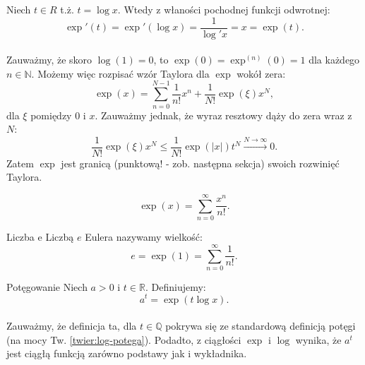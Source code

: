 \documentclass{article}
\newcounter{defi}
\numberwithin{defi}{section}
\numberwithin{defi}{section}
\newcommand{\R}{\mathbb{R}}
\newcommand{\N}{\mathbb{N}}
\newcommand{\Q}{\mathbb{Q}}
\newcommand{\oo}{\infty}
\renewcommand{\leq}{\leqslant}
\begin{document}
\begin{dow}{}
    Niech $t \in R$ t.ż. $t = \log x$. Wtedy z właności pochodnej funkcji odwrotnej: \begin{equation}
        \exp'(t) = \exp'(\log x) = \frac{1}{\log' x} = x = \exp(t).
    \end{equation}
\end{dow}


\paragraph{} Zauważmy, że skoro $\log(1) = 0$, to $\exp(0) = \exp^{(n)}(0) = 1$ dla każdego $n\in \N$. Możemy więc rozpisać wzór Taylora dla $\exp$ wokół zera: \begin{equation}
    \exp(x) = \sum_{n = 0}^{N - 1} \frac{1}{n!} x^n + \frac{1}{N!} \exp(\xi) x^N,
\end{equation} dla $\xi$ pomiędzy 0 i $x$. Zauważmy jednak, że wyraz resztowy dąży do zera wraz z $N$: \begin{equation}
    \frac{1}{N!} \exp(\xi) x^N \leq \frac{1}{N!} \exp(|x|) t^N \xrightarrow{N \to \oo} 0.
\end{equation} Zatem $\exp$ jest granicą (punktową! - zob. następna sekcja) swoich rozwinięć Taylora.

\begin{obs}{}
    \begin{equation}
        \exp(x) = \sum_{n = 0}^{\oo} \frac{x ^ n}{n!}.
    \end{equation}
\end{obs}

\begin{defr}{Liczba e}
    Liczbą $e$ Eulera nazywamy wielkość: \begin{equation}
        e = \exp (1) = \sum_{n = 0}^{\oo} \frac{1}{n!}.
    \end{equation}
\end{defr}

\begin{defr}{Potęgowanie}
    Niech $a > 0$ i $t \in \R$. Definiujemy: \begin{equation}
        a ^ t = \exp(t \log x).
    \end{equation}
\end{defr}
\paragraph{} Zauważmy, że definicja ta, dla $t \in \Q$ pokrywa się ze standardową definicją potęgi (na mocy Tw. \ref*{twier:log-potega}). Podadto, z ciągłości $\exp$ i $\log$ wynika, że $a^t$ jest ciągłą funkcją zarówno podstawy jak i wykładnika. 
\end{document}
